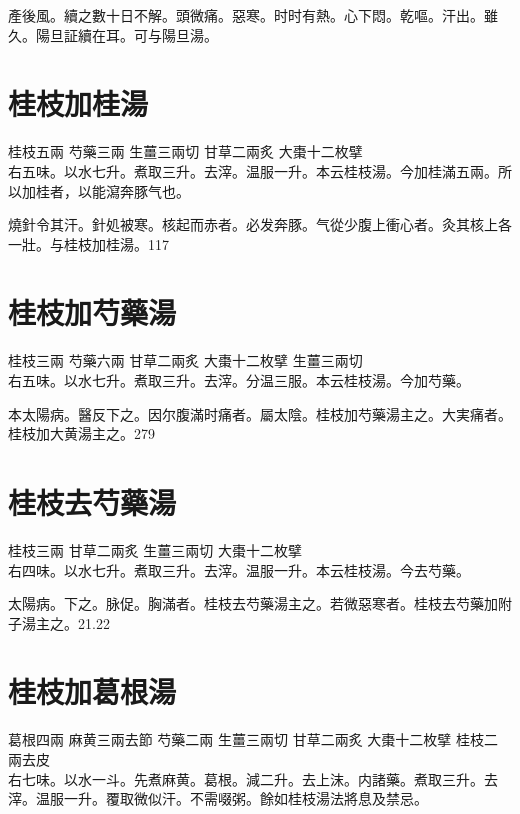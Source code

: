 產後風。續之數十日不解。頭微痛。惡寒。时时有熱。心下悶。乾嘔。汗出。雖久。陽旦証續在耳。可与陽旦湯。{\dengben}

\section{桂枝加桂湯}

桂枝{\scriptsize 五兩} 芍藥{\scriptsize 三兩} 生薑{\scriptsize 三兩切} 甘草{\scriptsize 二兩炙} 大棗{\scriptsize 十二枚擘}\\
右五味。以水七升。煮取三升。去滓。温服一升。本云桂枝湯。今加桂滿五兩。所以加桂者，以能瀉奔豚气也。

燒針令其汗。針処被寒。核起而赤者。必发奔豚。气從少腹上衝心者。灸其核上各一壯。与桂枝加桂湯。117

\section{桂枝加芍藥湯}

桂枝{\scriptsize 三兩} 芍藥{\scriptsize 六兩} 甘草{\scriptsize 二兩炙} 大棗{\scriptsize 十二枚擘} 生薑{\scriptsize 三兩切}\\
右五味。以水七升。煮取三升。去滓。分温三服。本云桂枝湯。今加芍藥。

{\khaaitp 本}太陽病。醫反下之。因尔腹滿时痛者。屬太陰。桂枝加芍藥湯主之。大実痛者。桂枝加大黄湯主之。279

\section{桂枝去芍藥湯}

桂枝{\scriptsize 三兩} 甘草{\scriptsize 二兩炙} 生薑{\scriptsize 三兩切} 大棗{\scriptsize 十二枚擘}\\
右四味。以水七升。煮取三升。去滓。温服一升。本云桂枝湯。今去芍藥。

太陽病。下之。脉促。胸滿者。桂枝去芍藥湯主之。若微{\khaaitp 惡}寒者。桂枝去芍藥加附子湯主之。21.22

\section{桂枝加葛根湯}

葛根{\scriptsize 四兩} 麻黄{\scriptsize 三兩去節} 芍藥{\scriptsize 二兩} 生薑{\scriptsize 三兩切} 甘草{\scriptsize 二兩炙} 大棗{\scriptsize 十二枚擘} 桂枝{\scriptsize 二兩去皮}\\
右七味。以水一斗。先煮麻黄。葛根。減二升。去上沫。内諸藥。煮取三升。去滓。温服一升。覆取微似汗。不需啜粥。餘如桂枝湯法將息及禁忌。

